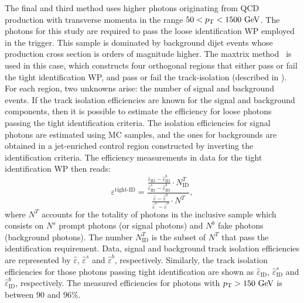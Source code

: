 The final and third method uses higher \pt photons originating from \ac{QCD} \gammajet production with transverse momenta in the range \(50<p_{\text{T}}<1500~\text{GeV}\). The photons for this study are required to pass the loose identification \ac{WP} employed in the trigger. This sample is dominated by background dijet events whose production cross section is orders of magnitude higher. The maxtrix method~\cite{ATLAS-EGamma-Performance-2015-2016} is used in this case, which constructs four orthogonal regions that either pass or fail the tight identification \ac{WP}, and pass or fail the track-isolation (described in \Sect{\ref{subsec:objects:egamma:iso}}). For each region, two unknowns arise: the number of signal and background events.
If the track isolation efficiencies are known for the signal and background components, then it is possible to estimate the efficiency for loose photons passing the tight identification criteria. The isolation efficiencies for signal photons are estimated using \ac{MC} samples, and the ones for backgrounds are obtained in a jet-enriched control region constructed by inverting the identification criteria.
The efficiency measurements in data for the tight identification \ac{WP} then reads:
\begin{equation}
    \varepsilon^{\text{tight-ID}} = \frac{
        \frac{
            \hat{\varepsilon}_{\text{ID}} - \hat{\varepsilon}_{\text{ID}}^b
        }{
            \hat{\varepsilon}_{\text{ID}}^s - \hat{\varepsilon}_{\text{ID}}^b
        }
        \cdot
        N_{\text{ID}}^T
    }{
        \frac{
            \hat{\varepsilon} - \hat{\varepsilon}^b
        }{
            \hat{\varepsilon}^s - \hat{\varepsilon}^b
        }
        \cdot
        N^T
    },
\end{equation}
where \(N^T\) accounts for the totality of photons in the inclusive sample which consists on \(N^s\) prompt photons (or signal photons) and \(N^b\) fake photons (background photons). The number \(N^T_{\text{ID}}\) is the subset of \(N^T\) that pass the identification requirement. Data, signal and background track isolation efficiencies are represented by \(\hat{\varepsilon}\), \(\hat{\varepsilon}^s\) and \(\hat{\varepsilon}^b\), respectively. Similarly, the track isolation efficiencies for those photons passing tight identification are shown as \(\hat{\varepsilon}_{\text{ID}}\), \(\hat{\varepsilon}_{\text{ID}}^s\) and \(\hat{\varepsilon}_{\text{ID}}^b\), respectively. The measured efficiencies for photons with \(p_{\text{T}}>150~\text{GeV}\) is between \(90\) and \(96\%\).

